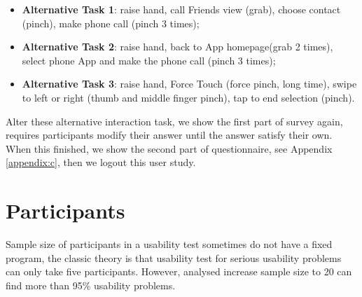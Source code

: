 \begin{itemize}
    \kaishu
    \item \textbf{Alternative Task 1}: raise hand, call Friends view (grab), choose contact (pinch), make phone call (pinch 3 times);
    \item \textbf{Alternative Task 2}: raise hand, back to App homepage(grab 2 times), select phone App and make the phone call (pinch 3 times);
    \item \textbf{Alternative Task 3}: raise hand, Force Touch (force pinch, long time), swipe to left or right (thumb and middle finger pinch), tap to end selection (pinch).
\end{itemize}

Alter these alternative interaction task, we show the first part of survey again, requires participants modify their answer until the answer satisfy their own. When this finished, we show the second part of questionnaire, see Appendix \ref{appendix:c}, then we logout this user study.

\section{Participants}

Sample size of participants in a usability test sometimes do not have a fixed program, the classic theory is that usability test for serious usability problems can only take five participants\cite{albert2013measuring}. However, \cite{faulkerner} analysed increase sample size to 20 can find more than 95\% usability problems.

